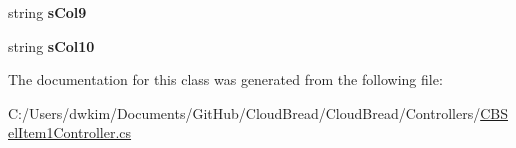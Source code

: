 \begin{DoxyCompactItemize}
\item 
string {\bfseries s\+Col9}\hypertarget{class_cloud_bread_1_1_controllers_1_1_c_b_sel_item1_controller_1_1_model_a2abcf097bdf77233afb9ef46b87e37ed}{}\label{class_cloud_bread_1_1_controllers_1_1_c_b_sel_item1_controller_1_1_model_a2abcf097bdf77233afb9ef46b87e37ed}

\item 
string {\bfseries s\+Col10}\hypertarget{class_cloud_bread_1_1_controllers_1_1_c_b_sel_item1_controller_1_1_model_a18922ae26284cb989c294db037cb019c}{}\label{class_cloud_bread_1_1_controllers_1_1_c_b_sel_item1_controller_1_1_model_a18922ae26284cb989c294db037cb019c}

\end{DoxyCompactItemize}


The documentation for this class was generated from the following file\+:\begin{DoxyCompactItemize}
\item 
C\+:/\+Users/dwkim/\+Documents/\+Git\+Hub/\+Cloud\+Bread/\+Cloud\+Bread/\+Controllers/\hyperlink{_c_b_sel_item1_controller_8cs}{C\+B\+Sel\+Item1\+Controller.\+cs}\end{DoxyCompactItemize}

